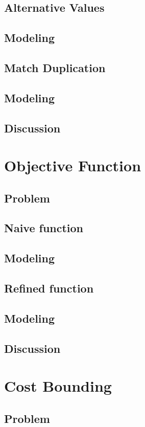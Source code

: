 \documentclass{book}
\begin{document}
\section{Alternative Values}
\section{Modeling}
\section{Match Duplication}
\section{Modeling}
\section{Discussion}

\chapter{Objective Function}
\section{Problem}
\section{Naive function}
\section{Modeling}
\section{Refined function}
\section{Modeling}
\section{Discussion}

\chapter{Cost Bounding}
\section{Problem}
\end{document}
